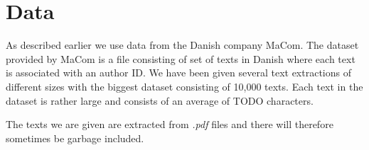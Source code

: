 \section{Data} \label{sec:data}

As described earlier we use data from the Danish company MaCom. The dataset
provided by MaCom is a file consisting of set of texts in Danish where each
text is associated with an author ID. We have been given several text
extractions of different sizes with the biggest dataset consisting of 10,000
texts. Each text in the dataset is rather large and consists of an average of
TODO characters.

The texts we are given are extracted from \textit{.pdf} files and there will
therefore sometimes be garbage included.

